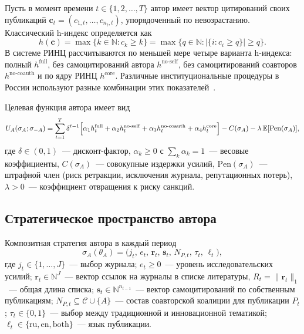 \documentclass[12pt,a4paper]{article}
\theoremstyle{definition}
\newcommand{\N}{\mathbb{N}}
\newcommand{\E}{\mathbb{E}}
\begin{document}
Пусть в момент времени $t \in \{1, 2, \dots, T\}$ автор имеет вектор
цитирований своих публикаций $\bm{c}_t = (c_{1,t}, \dots,
c_{n_t,t})$, упорядоченный по невозрастанию. Классический h-индекс
определяется как
\begin{equation}
  h(\bm{c}) = \max\bigl\{k \in \N : c_k \geq k\bigr\} = \max\bigl\{q
  \in \N : |\{i : c_i \geq q\}| \geq q\bigr\}.
  \label{eq:hindex-def}
\end{equation}
В системе РИНЦ рассчитываются по меньшей мере четыре варианта
h-индекса: полный $h^{\mathrm{full}}$, без самоцитирований автора
$h^{\mathrm{no\text{-}self}}$, без самоцитирований соавторов
$h^{\mathrm{no\text{-}coauth}}$ и по ядру РИНЦ $h^{\mathrm{core}}$.
Различные институциональные процедуры в России используют разные
комбинации этих показателей~\citep{akoev2021}.

Целевая функция автора имеет вид
\begin{equation}
  U_A(\sigma_A; \sigma_{-A}) = \sum_{t=1}^{T} \delta^{t-1} \Bigl[
    \alpha_1 h_t^{\mathrm{full}} + \alpha_2
    h_t^{\mathrm{no\text{-}self}} + \alpha_3
    h_t^{\mathrm{no\text{-}coauth}} + \alpha_4 h_t^{\mathrm{core}}
  \Bigr] - C(\sigma_A) - \lambda \,\E[\mathrm{Pen}(\sigma_A)],
  \label{eq:utility-author}
\end{equation}
где $\delta \in (0,1)$~--- дисконт-фактор, $\alpha_k \geq 0$ с
$\sum_k \alpha_k = 1$~--- весовые коэффициенты, $C(\sigma_A)$~---
совокупные издержки усилий, $\mathrm{Pen}(\sigma_A)$~--- штрафной
член (риск ретракции, исключения журнала, репутационных потерь),
$\lambda > 0$~--- коэффициент отвращения к риску санкций.

\subsection{Стратегическое пространство автора}

Композитная стратегия автора в каждый период
\begin{equation}
  \sigma_A(\theta_A) = \bigl(j_t,\, e_t,\, \bm{r}_t,\, \bm{s}_t,\,
  N_{P,t},\, \tau_t,\, \ell_t\bigr),
  \label{eq:author-strategy}
\end{equation}
где $j_t \in \{1, \dots, J\}$~--- выбор журнала; $e_t \geq 0$~---
уровень исследовательских усилий; $\bm{r}_t \in \N^J$~--- вектор
ссылок на журналы в списке литературы, $R_t = \|\bm{r}_t\|_1$~---
общая длина списка; $\bm{s}_t \in \N^{n_{t-1}}$~--- вектор
самоцитирований по собственным публикациям; $N_{P,t} \subseteq
\mathcal{C} \cup \{A\}$~--- состав соавторской коалиции для
публикации $P_t$; $\tau_t \in \{0,1\}$~--- выбор между традиционной и
инновационной тематикой; $\ell_t \in \{\text{ru}, \text{en},
\text{both}\}$~--- язык публикации.
\end{document}
